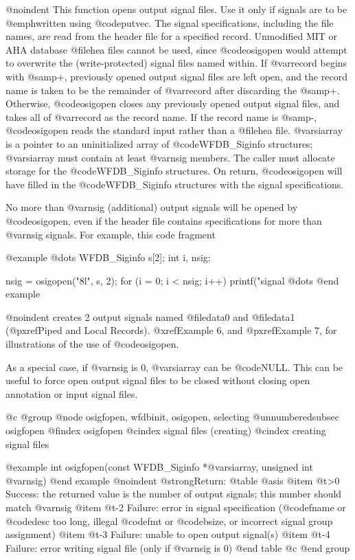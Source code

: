 {{{{{{{{@noindent
This function opens output signal files.  Use it only if signals are to
be @emph{written} using @code{putvec}.  The signal specifications,
including the file names, are read from the header file for a
specified record.  Unmodified MIT or AHA database @file{hea} files
cannot be used, since @code{osigopen} would attempt to overwrite the
(write-protected) signal files named within.  If @var{record} begins
with @samp{+}, previously opened output signal files are left open, and
the record name is taken to be the remainder of @var{record} after
discarding the @samp{+}.  Otherwise, @code{osigopen} closes any
previously opened output signal files, and takes all of @var{record} as
the record name.  If the record name is @samp{-}, @code{osigopen} reads
the standard input rather than a @file{hea} file.  @var{siarray} is a
pointer to an uninitialized array of @code{WFDB_Siginfo} structures;
@var{siarray} must contain at least @var{nsig} members.  The caller must
allocate storage for the @code{WFDB_Siginfo} structures.  On return,
@code{osigopen} will have filled in the @code{WFDB_Siginfo} structures with
the signal specifications.

No more than @var{nsig} (additional) output signals will be opened by
@code{osigopen}, even if the header file contains specifications for
more than @var{nsig} signals.  For example, this code fragment

@example
@dots{}
WFDB_Siginfo s[2];
int i, nsig;

nsig = osigopen("8l", s, 2);
for (i = 0; i < nsig; i++)
    printf("signal %
@dots{}
@end example

@noindent
creates 2 output signals named @file{data0} and @file{data1}
(@pxref{Piped and Local Records}).  @xref{Example 6}, and @pxref{Example 7},
for illustrations of the use of @code{osigopen}.

As a special case, if @var{nsig} is 0, @var{siarray} can be @code{NULL}.
This can be useful to force open output signal files to be closed
without closing open annotation or input signal files.

@c @group
@node     osigfopen, wfdbinit, osigopen, selecting
@unnumberedsubsec osigfopen
@findex osigfopen
@cindex signal files (creating)
@cindex creating signal files

@example
int osigfopen(const WFDB_Siginfo *@var{siarray}, unsigned int @var{nsig})
@end example
@noindent
@strong{Return:}
@table @asis
@item @t{>0}
Success: the returned value is the number of output signals;  this number
should match @var{nsig}
@item @t{-2}
Failure: error in signal specification (@code{fname} or @code{desc} too
long, illegal @code{fmt} or @code{bsize}, or incorrect signal group
assignment)
@item @t{-3}
Failure: unable to open output signal(s)
@item @t{-4}
Failure: error writing signal file (only if @var{nsig} is 0)
@end table
@c @end group

}}}}}}}}
